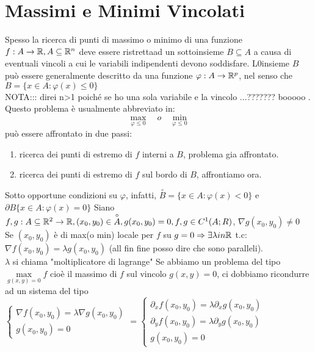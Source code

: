 \section{Massimi e Minimi Vincolati}
Spesso la ricerca di punti di massimo o minimo di una funzione $f:A\rightarrow \mathbb{R}, A\subseteq \mathbb{R}^n$ deve essere ristrettaad un sottoinsieme $B\subseteq A$ a causa di eventuali vincoli a cui le variabili indipendenti devono soddisfare. L0insieme $B$ può essere generalmente descritto da una funzione $\varphi :A\rightarrow \mathbb{R}^p$, nel senso che $B=\{x\in A:\varphi (x)\le 0\}$\\
NOTA::: direi n>1 poiché se ho una sola variabile e la vincolo ...??????? booooo .\\
Questo problema è usualmente abbreviato in:
$$\max\limits_{\varphi \le 0}\quad o \quad\min\limits_{\varphi \le 0}$$
può essere affrontato in due passi:\\
\begin{enumerate}
	\item ricerca dei punti di estremo di $f$ interni a $B$, problema gia affrontato.
	\item ricerca dei punti di estremo di $f$ sul bordo di $B$, affrontiamo ora.
\end{enumerate}
Sotto opportune condizioni su $\varphi$, infatti, $\overset{\circ}{B} = \{x\in A:\varphi(x)<0\}$ e $\partial B\{x\in A:\varphi(x)=0\}$
Siano $f,g:A\subseteq \mathbb{R}^2\rightarrow \mathbb{R}, (x_0,y_0)\in\overset{\circ}{A}, g(x_0,y_0)=0, f,g\in C^1(A;R)$, $\nabla g (x_0,y_0)\ne 0$\\
Se $(x_0,y_0)$ è di max(o min) locale per $f$ su $g=0\Rightarrow\exists \lambda in \mathbb{R}$ t.c: $\nabla f(x_0,y_0) = \lambda g(x_0,y_0)$ (all fin fine posso dire che sono paralleli).\\
\observation
$\lambda$ si chiama "moltiplicatore di lagrange"
\observation
Se abbiamo un problema del tipo $\max\limits_{g(x,y)=0}f$ cioè il massimo di $f$ sul vincolo $g(x,y)=0$, ci dobbiamo ricondurre ad un sistema del tipo
$\begin{cases} \nabla f(x_0,y_0)=\lambda \nabla g(x_0,y_0)\\ g(x_0,y_0)=0 \end{cases}=\begin{cases} \partial_xf(x_0,y_0)=\lambda \partial_xg(x_0,y_0)\\\partial_yf(x_0,y_0)=\lambda \partial_yg(x_0,y_0)\\ g(x_0,y_0)=0 \end{cases}$\\
